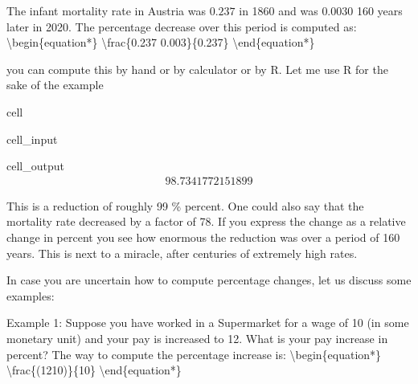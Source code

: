 \documentclass[letterpaper,10pt,english]{jupyterBook}
\begin{document}
\sphinxAtStartPar
The infant mortality rate in Austria was \(0.237\) in 1860 and was \(0.0030\) 160 years later in 2020. The percentage decrease over this period is computed as:
\textbackslash{}begin\{equation*\}
\textbackslash{}frac\{0.237 \sphinxhyphen{} 0.003\}\{0.237\}
\textbackslash{}end\{equation*\}

\sphinxAtStartPar
you can compute this by hand or by calculator or by R. Let me use R for the sake of the example

\begin{sphinxuseclass}{cell}\begin{sphinxVerbatimInput}

\begin{sphinxuseclass}{cell_input}
\begin{sphinxVerbatim}[commandchars=\\\{\}]
\end{sphinxVerbatim}

\end{sphinxuseclass}\end{sphinxVerbatimInput}
\begin{sphinxVerbatimOutput}

\begin{sphinxuseclass}{cell_output}\begin{equation*}
\begin{split}98.7341772151899\end{split}
\end{equation*}
\end{sphinxuseclass}\end{sphinxVerbatimOutput}

\end{sphinxuseclass}
\sphinxAtStartPar
This is a reduction of roughly 99 \% percent. One could also say that the mortality rate decreased by a factor of 78. If you express the change as a relative change in percent you see how enormous the reduction was over a period of 160 years. This is next to a miracle, after centuries of extremely high rates.

\sphinxAtStartPar
In case you are uncertain how to compute percentage changes, let us discuss some examples:

\sphinxAtStartPar
Example 1: Suppose you have worked in a Supermarket for a wage of 10 (in some monetary unit) and your pay is increased to 12. What is your pay increase in percent? The way to compute the percentage increase is:
\textbackslash{}begin\{equation*\}
\textbackslash{}frac\{(12\sphinxhyphen{}10)\}\{10\}
\textbackslash{}end\{equation*\}
\end{document}
